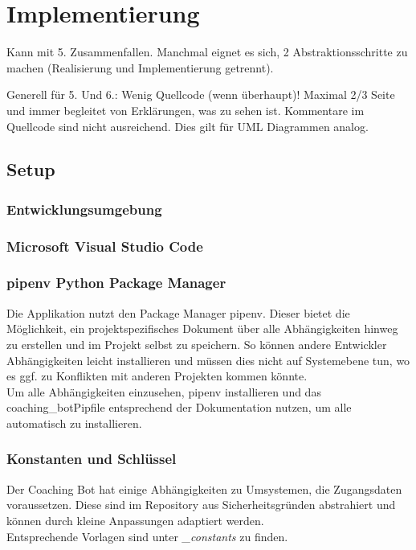 \chapter{Implementierung}

Kann mit 5. Zusammenfallen. Manchmal eignet es sich, 2 Abstraktionsschritte zu machen (Realisierung und Implementierung getrennt).  
  
Generell für 5. Und 6.: Wenig Quellcode (wenn überhaupt)! Maximal 2/3 Seite und immer begleitet von Erklärungen, was zu sehen ist. Kommentare im Quellcode sind nicht ausreichend. Dies gilt für UML Diagrammen analog.  


    \section{Setup}
        \subsection{Entwicklungsumgebung}


        \subsection{Microsoft Visual Studio Code}


        \subsection{pipenv \- Python Package Manager}
            Die Applikation nutzt den Package Manager pipenv. Dieser bietet die Möglichkeit, ein projektspezifisches Dokument über alle Abhängigkeiten hinweg zu erstellen und im Projekt selbst zu speichern. So können andere Entwickler Abhängigkeiten leicht installieren und müssen dies nicht auf Systemebene tun, wo es ggf. zu Konflikten mit anderen Projekten kommen könnte.\\
            Um alle Abhängigkeiten einzusehen, pipenv \cite{pipenv} installieren und das coaching\_bot\/Pipfile entsprechend der Dokumentation nutzen, um alle automatisch zu installieren.


        \subsection{Konstanten und Schlüssel}
            Der Coaching Bot hat einige Abhängigkeiten zu Umsystemen, die Zugangsdaten voraussetzen. Diese sind im Repository \cite{repo} aus Sicherheitsgründen abstrahiert und können durch kleine Anpassungen adaptiert werden.\\ Entsprechende Vorlagen sind unter \emph{\_constants} zu finden.


